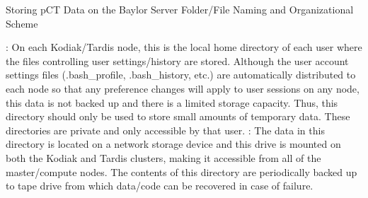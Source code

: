 \documentclass[landscape,12pt]{article}
\begin{document}
\pagestyle{fancy}
{}

\shadowoffset{0.5pt}
\begin{boxtitle}
    {Storing pCT Data on the Baylor Server}
    {}
    {Folder/File Naming and Organizational Scheme}
\end{boxtitle}
\vspace{-3mm}
\baylorsection
\color{Black}
\vspace{-5mm}
\flushleft\textbf{}\color{Black} : On each Kodiak/Tardis node, this is the local home directory of each user where the files controlling user settings/history are stored.  Although the user account settings files (.bash\_profile, .bash\_history, etc.) are automatically distributed to each node so that any preference changes will apply to user sessions on any node, this data is not backed up and there is a limited storage capacity.  Thus, this directory should only be used to store small amounts of temporary data.  These directories are private and only accessible by that user.
\vspace{-5mm}
\flushleft\textbf{}\color{Black} : The data in this directory is located on a network storage device and this drive is mounted on both the Kodiak and Tardis clusters, making it accessible from all of the master/compute nodes.  The contents of this directory are periodically backed up to tape drive from which data/code can be recovered in case of failure.
\end{document}
